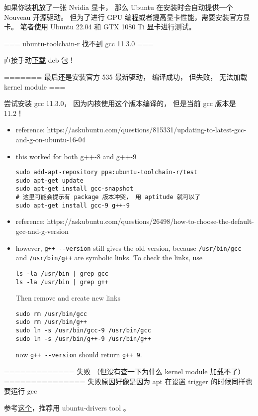 
如果你装机放了一张 Nvidia 显卡， 那么 Ubuntu 在安装时会自动提供一个 Nouveau 开源驱动。 但为了进行 GPU 编程或者提高显卡性能，需要安装官方显卡。 笔者使用 Ubuntu 22.04 和 GTX 1080 Ti 显卡进行测试。

=== ubuntu-toolchain-r 找不到 gcc 11.3.0 ===

直接手动\href{https://old-releases.ubuntu.com/ubuntu/pool/main/g/gcc-11/}{下载} deb 包！


======= 最后还是安装官方 535 最新驱动， 编译成功， 但失败， 无法加载 kernel module ===

尝试安装 gcc 11.3.0， 因为内核使用这个版本编译的， 但是当前 gcc 版本是 11.2！

\begin{itemize}
\item reference: https://askubuntu.com/questions/815331/updating-to-latest-gcc-and-g-on-ubuntu-16-04
\item this worked for both g++-8 and g++-9
\begin{lstlisting}[language=none]
sudo add-apt-repository ppa:ubuntu-toolchain-r/test
sudo apt-get update
sudo apt-get install gcc-snapshot
# 这里可能会提示有 package 版本冲突， 用 aptitude 就可以了
sudo apt-get install gcc-9 g++-9
\end{lstlisting}
\item reference: https://askubuntu.com/questions/26498/how-to-choose-the-default-gcc-and-g-version
\item however, \verb`g++ --version` still gives the old version, because \verb`/usr/bin/gcc` and \verb`/usr/bin/g++` are symbolic links. To check the links, use
\begin{lstlisting}[language=none]
ls -la /usr/bin | grep gcc
ls -la /usr/bin | grep g++
\end{lstlisting}
Then remove and create new links
\begin{lstlisting}[language=none]
sudo rm /usr/bin/gcc
sudo rm /usr/bin/g++
sudo ln -s /usr/bin/gcc-9 /usr/bin/gcc
sudo ln -s /usr/bin/g++-9 /usr/bin/g++
\end{lstlisting}
now \verb`g++ --version` should return \verb`g++ 9`.
\end{itemize}



============= 失败 （但没有查一下为什么 kernel module 加载不了） ===============
失败原因好像是因为 apt 在设置 trigger 的时候同样也要运行 gcc

参考\href{https://ubuntu.com/server/docs/nvidia-drivers-installation}{这个}，推荐用 ubuntu-drivers tool 。

